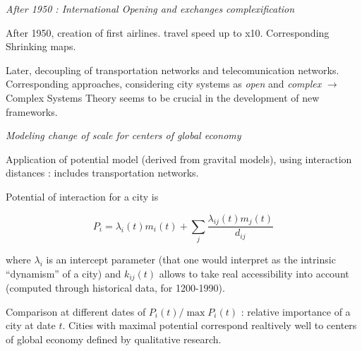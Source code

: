 \textit{After 1950 : International Opening and exchanges complexification}

After 1950, creation of first airlines. travel speed up to x10. Corresponding Shrinking maps.

Later, decoupling of transportation networks and telecomunication networks. Corresponding approaches, considering city systems as \emph{open} and \emph{complex} $\rightarrow$ Complex Systems Theory seems to be crucial in the development of new frameworks.

\bigskip
\textit{Modeling change of scale for centers of global economy}  

Application of potential model (derived from gravital models), using interaction distances : includes transportation networks.

Potential of interaction for a city is

\[
P_i = \lambda_i(t) m_i(t) + \sum_{j}{\frac{\lambda_{ij}(t)m_j(t)}{d_{ij}}}
\]

where $\lambda_i$ is an intercept parameter (that one would interpret as the intrinsic ``dynamism'' of a city) and $k_{ij}(t)$ allows to take real accessibility into account (computed through historical data, for 1200-1990).

Comparison at different dates of $P_i(t)/\max{P_i(t)}$ : relative importance of a city at date $t$. Cities with maximal potential correspond realtively well to centers of global economy defined by qualitative research.










